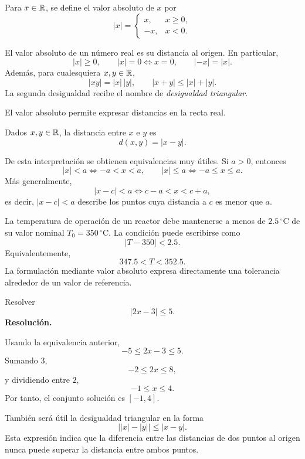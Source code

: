 \begin{definition}
Para \(x\in\mathbb{R}\), se define el valor absoluto de \(x\) por
\[
|x|=
\begin{cases}
 x, & x\geq0,\\
 -x, & x<0.
\end{cases}
\]
\end{definition}

El valor absoluto de un número real es su distancia al origen. En particular,
\[
|x|\geq0,
\qquad
|x|=0\Longleftrightarrow x=0,
\qquad
|-x|=|x|.
\]
Además, para cualesquiera \(x,y\in\mathbb{R}\),
\[
|xy|=|x|\,|y|,
\qquad
|x+y|\leq |x|+|y|.
\]
La segunda desigualdad recibe el nombre de \emph{desigualdad triangular}.

El valor absoluto permite expresar distancias en la recta real.

\begin{definition}[Distancia en \(\R\)]
Dados \(x,y\in\mathbb{R}\), la distancia entre \(x\) e \(y\) es
\[
d(x,y)=|x-y|.
\]
\end{definition}

De esta interpretación se obtienen equivalencias muy útiles. Si \(a>0\), entonces
\[
|x|<a\Longleftrightarrow -a<x<a,
\qquad
|x|\leq a\Longleftrightarrow -a\leq x\leq a.
\]
Más generalmente,
\[
|x-c|<a\Longleftrightarrow c-a<x<c+a,
\]
es decir, \(|x-c|<a\) describe los puntos cuya distancia a \(c\) es menor que \(a\).

\begin{example}
La temperatura de operación de un reactor debe mantenerse a menos de \(2.5\,^{\circ}\mathrm{C}\) de su valor nominal \(T_0=350\,^{\circ}\mathrm{C}\). La condición puede escribirse como
\[
|T-350|<2.5.
\]
Equivalentemente,
\[
347.5<T<352.5.
\]
La formulación mediante valor absoluto expresa directamente una tolerancia alrededor de un valor de referencia.
\end{example}

\begin{solvedexercise}
Resolver
\[
|2x-3|\leq5.
\]
\tcblower
\textbf{Resolución.}\par\smallskip
Usando la equivalencia anterior,
\[
-5\leq2x-3\leq5.
\]
Sumando \(3\),
\[
-2\leq2x\leq8,
\]
y dividiendo entre \(2\),
\[
-1\leq x\leq4.
\]
Por tanto, el conjunto solución es \([-1,4]\).
\end{solvedexercise}

También será útil la desigualdad triangular en la forma
\[
\bigl||x|-|y|\bigr|\leq|x-y|.
\]
Esta expresión indica que la diferencia entre las distancias de dos puntos al origen nunca puede superar la distancia entre ambos puntos.

